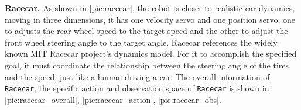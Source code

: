 \documentclass{article}
\begin{document}
\textbf{Racecar.} As shown in \autoref{pic:racecar},  the robot is closer to realistic car dynamics, moving in three dimensions, it has one velocity servo and one position servo, one to adjusts the rear wheel speed to the target speed and the other to adjust the front wheel steering angle to the target angle. Racecar references the widely known MIT Racecar project’s dynamics model. For it to accomplish the specified goal, it must coordinate the relationship between the steering angle of the tires and the speed, just like a human driving a car. The overall information of \texttt{Racecar}, the specific action and observation space of \texttt{Racecar} is shown in \autoref{pic:racecar_overall}, \autoref{pic:racecar_action}, \autoref{pic:racecar_obs}.


\begin{table}[H]
\caption{The overall information of Ant}
\label{pic:ant_overall}
\centering
{}
\end{table}
\end{document}
